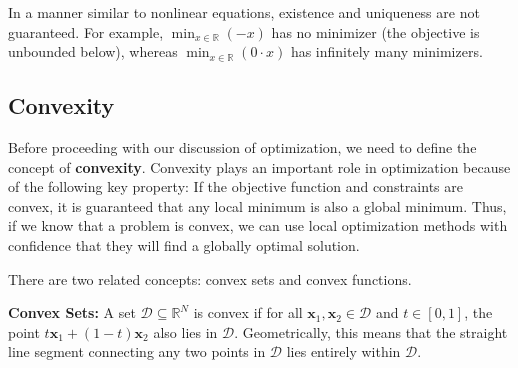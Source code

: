 In a manner similar to nonlinear equations, existence and uniqueness are not guaranteed. For example, $\min_{x \in \mathbb{R}} (-x)$ has no minimizer (the objective is unbounded below), whereas $\min_{x \in \mathbb{R}} (0\cdot x)$ has infinitely many minimizers.

\subsection{Convexity}
\label{sec:convexity}
Before proceeding with our discussion of optimization, we need to define the concept of \textbf{convexity}.
Convexity plays an important role in optimization because of the following key property:
If the objective function and constraints are convex, it is guaranteed that any local minimum is also a global minimum.
Thus, if we know that a problem is convex, we can use local optimization methods with confidence that they will find a globally optimal solution.

There are two related concepts: convex sets and convex functions.

\textbf{Convex Sets:}
A set $\mathcal{D} \subseteq \mathbb{R}^N$ is convex if for all $\mathbf{x}_1,\mathbf{x}_2 \in \mathcal{D}$ and $t\in[0,1]$, the point $t \mathbf{x}_1 + (1-t) \mathbf{x}_2$ also lies in $\mathcal{D}$. Geometrically, this means that the straight line segment connecting any two points in $\mathcal{D}$ lies entirely within $\mathcal{D}$.

